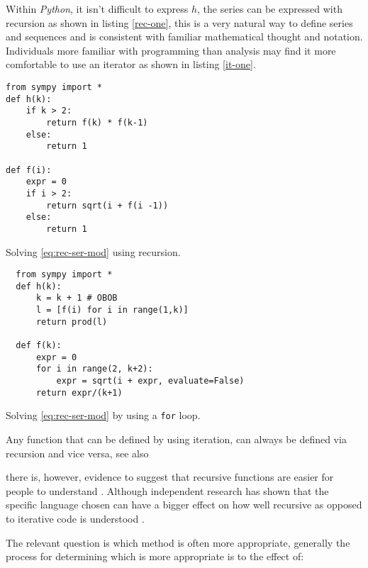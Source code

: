 \documentclass[11pt]{article}
\begin{document}
Within \emph{Python}, it isn't difficult to express \(h\), the series can be expressed with recursion as shown in listing \ref{rec-one}, this is a very natural way to define series and sequences and is consistent with familiar mathematical thought and notation. Individuals more familiar with programming than analysis may find it more comfortable to use an iterator as shown in listing \ref{it-one}.

\begin{listing}[htbp]
\begin{verbatim}
from sympy import *
def h(k):
    if k > 2:
        return f(k) * f(k-1)
    else:
        return 1

def f(i):
    expr = 0
    if i > 2:
        return sqrt(i + f(i -1))
    else:
        return 1
\end{verbatim}
\caption{\label{rec-one}Solving \eqref{eq:rec-ser-mod} using recursion.}
\end{listing}


\begin{listing}[htbp]
\begin{verbatim}
  from sympy import *
  def h(k):
      k = k + 1 # OBOB
      l = [f(i) for i in range(1,k)]
      return prod(l)

  def f(k):
      expr = 0
      for i in range(2, k+2):
          expr = sqrt(i + expr, evaluate=False)
      return expr/(k+1)
\end{verbatim}
\caption{\label{it-one}Solving \eqref{eq:rec-ser-mod} by using a \texttt{for} loop.}
\end{listing}

Any function that can be defined by using iteration, can always be defined via
recursion and vice versa,
\cite{bohmReducingRecursionIteration1988,bohmReducingRecursionIteration1986}
see also
\cite{smolarskiMath60Notes2000,IterationVsRecursion2016}

there is, however, evidence to suggest that recursive functions are easier for people to understand \cite{benanderEmpiricalAnalysisDebugging2000} . Although independent research has shown that the specific language chosen can have a bigger effect on how well recursive as opposed to iterative code is understood \cite{sinhaCognitiveFitEmpirical1992}.

The relevant question is which method is often more appropriate, generally the process for
determining which is more appropriate is to the effect of:
\end{document}

